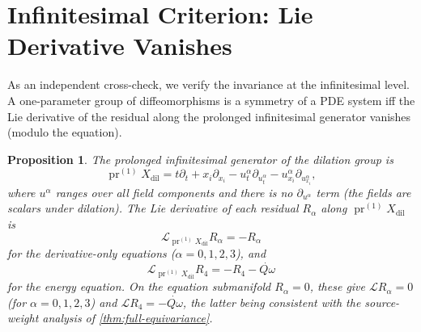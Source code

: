 \documentclass[11pt]{article}
\newtheorem{proposition}[theorem]{Proposition}
\theoremstyle{definition}
\theoremstyle{remark}
\newcommand{\Qdot}{\dot{Q\omega}}
\begin{document}
\section{Infinitesimal Criterion: Lie Derivative Vanishes}
\label{sec:infinitesimal}

As an independent cross-check, we verify the invariance at the infinitesimal
level.  A one-parameter group of diffeomorphisms is a symmetry of a PDE
system iff the Lie derivative of the residual along the prolonged
infinitesimal generator vanishes (modulo the equation).

\begin{proposition}
The prolonged infinitesimal generator of the dilation group is
\[
\operatorname{pr}^{(1)}X_{\mathrm{dil}}
=t\partial_t+x_i\partial_{x_i}
-u^\alpha_t\partial_{u^\alpha_t}
-u^\alpha_{x_i}\partial_{u^\alpha_{x_i}},
\]
where $u^\alpha$ ranges over all field components and there is no
$\partial_{u^\alpha}$ term (the fields are scalars under dilation).  The Lie
derivative of each residual $R_\alpha$ along $\operatorname{pr}^{(1)}
X_{\mathrm{dil}}$ is
\[
\mathcal L_{\operatorname{pr}^{(1)}X_{\mathrm{dil}}}R_\alpha=-R_\alpha
\]
for the derivative-only equations ($\alpha=0,1,2,3$), and
\[
\mathcal L_{\operatorname{pr}^{(1)}X_{\mathrm{dil}}}R_4=-R_4-\Qdot
\]
for the energy equation.  On the equation submanifold $R_\alpha=0$, these
give $\mathcal L R_\alpha=0$ (for $\alpha=0,1,2,3$) and $\mathcal L R_4=
-\Qdot$, the latter being consistent with the source-weight analysis of
\ref{thm:full-equivariance}.
\end{proposition}
\end{document}
